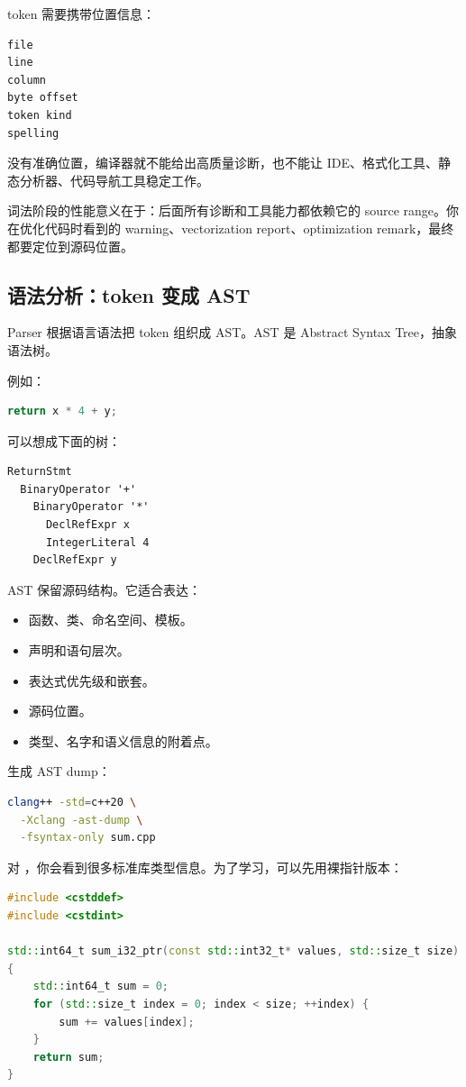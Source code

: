 token 需要携带位置信息：

\begin{lstlisting}
file
line
column
byte offset
token kind
spelling
\end{lstlisting}

没有准确位置，编译器就不能给出高质量诊断，也不能让 IDE、格式化工具、静态分析器、代码导航工具稳定工作。

词法阶段的性能意义在于：后面所有诊断和工具能力都依赖它的 source range。你在优化代码时看到的 warning、vectorization report、optimization remark，最终都要定位到源码位置。

\subsection{语法分析：token 变成 AST}

Parser 根据语言语法把 token 组织成 AST。AST 是 Abstract Syntax Tree，抽象语法树。

例如：

\begin{lstlisting}[language=C++]
return x * 4 + y;
\end{lstlisting}

可以想成下面的树：

\begin{lstlisting}
ReturnStmt
  BinaryOperator '+'
    BinaryOperator '*'
      DeclRefExpr x
      IntegerLiteral 4
    DeclRefExpr y
\end{lstlisting}

AST 保留源码结构。它适合表达：

\begin{itemize}
  \item 函数、类、命名空间、模板。
  \item 声明和语句层次。
  \item 表达式优先级和嵌套。
  \item 源码位置。
  \item 类型、名字和语义信息的附着点。
\end{itemize}

生成 AST dump：

\begin{lstlisting}[language=bash]
clang++ -std=c++20 \
  -Xclang -ast-dump \
  -fsyntax-only sum.cpp
\end{lstlisting}

对 ，你会看到很多标准库类型信息。为了学习，可以先用裸指针版本：

\begin{lstlisting}[language=C++]
#include <cstddef>
#include <cstdint>

std::int64_t sum_i32_ptr(const std::int32_t* values, std::size_t size)
{
    std::int64_t sum = 0;
    for (std::size_t index = 0; index < size; ++index) {
        sum += values[index];
    }
    return sum;
}
\end{lstlisting}


